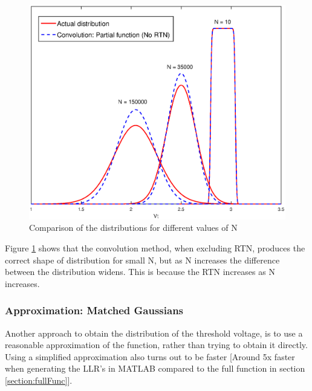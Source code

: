 \documentclass[11pt]{article}
\numberwithin{equation}{subsection}
\begin{document}
\begin{figure}[h]
\centering
\includegraphics[scale=0.6]{retention_convolution}
\caption{Comparison of the distributions for different values of N}
\label{fig:retentionVsFull}
\end{figure}
Figure \ref{fig:retentionVsFull} shows that the convolution method, when excluding RTN, produces the correct shape of distribution for small N, but as N increases the difference between the distribution widens. This is because the RTN increases as N increases.

\subsubsection{Approximation: Matched Gaussians}
Another approach to obtain the distribution of the threshold voltage, is to use a reasonable approximation of the function, rather than trying to obtain it directly. Using a simplified approximation also turns out to be faster [Around 5x faster when generating the LLR's in MATLAB compared to the full function in section \ref{section:fullFunc}].
\end{document}
